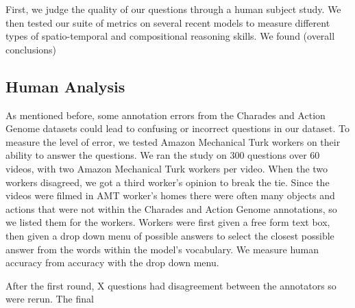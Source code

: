 \documentclass[10pt,twocolumn,letterpaper]{article}
\newcommand{\mgm}[1]{{\color{cyan}{mgm: #1}}}
\begin{document}



First, we judge the quality of our questions through a human subject study. We then tested our suite of metrics on several recent models to measure different types of spatio-temporal and compositional reasoning skills. We found (overall conclusions)

\subsection{Human Analysis}

\mgm{Include here the work other similar benchmarks did? How a lot of videoQA don't measure human accuracy, and what CLEVR/GQA got?}

As mentioned before, some annotation errors from the Charades and Action Genome datasets could lead to confusing or incorrect questions in our dataset. To measure the level of error, we tested Amazon Mechanical Turk workers on their ability to answer the questions. We ran the study on 300 questions over 60 videos, with two Amazon Mechanical Turk workers per video. When the two workers disagreed, we got a third worker's opinion to break the tie. Since the videos were filmed in AMT worker's homes there were often many objects and actions that were not within the Charades and Action Genome annotations, so we listed them for the workers. Workers were first given a free form text box, then given a drop down menu of possible answers to select the closest possible answer from the words within the model's vocabulary. We measure human accuracy from accuracy with the drop down menu. 

After the first round, X questions had disagreement between the annotators so were rerun. The final 
\end{document}
